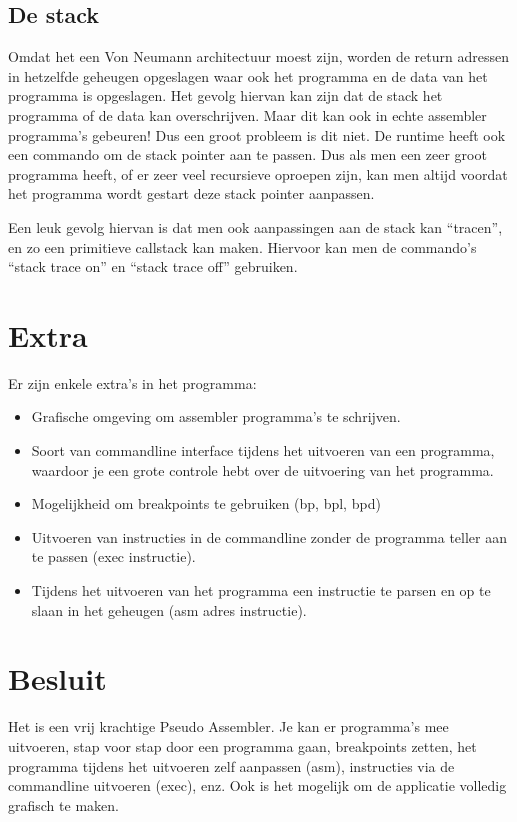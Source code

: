 \documentclass[a4paper,11pt]{article}
\begin{document}
\subsection{De stack}

Omdat het een Von Neumann architectuur moest zijn, worden de return adressen in hetzelfde geheugen opgeslagen waar ook het programma en de data van het programma is opgeslagen. Het gevolg hiervan kan zijn dat de stack het programma of de data kan overschrijven. Maar dit kan ook in echte assembler programma's gebeuren! Dus een groot probleem is dit niet. De runtime heeft ook een commando om de stack pointer aan te passen. Dus als men een zeer groot programma heeft, of er zeer veel recursieve oproepen zijn, kan men altijd voordat het programma wordt gestart deze stack pointer aanpassen.

Een leuk gevolg hiervan is dat men ook aanpassingen aan de stack kan ``tracen'', en zo een primitieve callstack kan maken. Hiervoor kan men de commando's ``stack trace on'' en ``stack trace off'' gebruiken.

\section{Extra}

Er zijn enkele extra's in het programma:

\begin{itemize}
\item Grafische omgeving om assembler programma's te schrijven.
\item Soort van commandline interface tijdens het uitvoeren van een programma, waardoor je een grote controle hebt over de uitvoering van het programma.
\item Mogelijkheid om breakpoints te gebruiken (bp, bpl, bpd)
\item Uitvoeren van instructies in de commandline zonder de programma teller aan te passen (exec instructie).
\item Tijdens het uitvoeren van het programma een instructie te parsen en op te slaan in het geheugen (asm adres instructie).
\end{itemize}

\section{Besluit}

Het is een vrij krachtige Pseudo Assembler. Je kan er programma's mee uitvoeren, stap voor stap door een programma gaan, breakpoints zetten, het programma tijdens het uitvoeren zelf aanpassen (asm), instructies via de commandline uitvoeren (exec), enz. Ook is het mogelijk om de applicatie volledig grafisch te maken.
\end{document}
